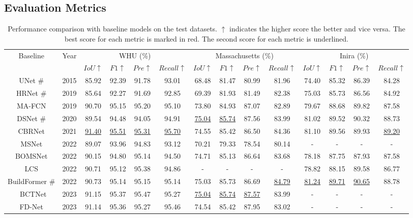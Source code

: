 \documentclass[lettersize,journal]{IEEEtran}
\begin{document}
\subsection{Evaluation Metrics}
\begin{table*}[]
\normalsize
\setlength\tabcolsep{3pt}
\caption{Performance comparison with baseline models on the test datasets. $\uparrow$ indicates the higher score the better and vice versa. The best score for each metric is marked in red. The second score for each metric is underlined.}
\label{tab:table_test}
\center
\begin{tabular}{c|c|cccc|cccc|cccc}
\hline
\multirow{2}{*}{Baseline}& \multirow{2}{*}{Year} & \multicolumn{4}{c|}{WHU (\%)}&\multicolumn{4}{c|}{Massachusetts (\%)} &\multicolumn{4}{c}{Inira (\%)}                                             
 \\ \cline{3-14} 
 & & $IoU\uparrow$ & $F1\uparrow$ & $Pre\uparrow$ & $Recall\uparrow$ 
 & $IoU\uparrow$ & $F1\uparrow$ & $Pre\uparrow$ & $Recall\uparrow$
 & $IoU\uparrow$ & $F1\uparrow$ & $Pre\uparrow$ & $Recall\uparrow$ \\ \hline
UNet \#& 2015 &
85.92 &92.39 &91.78 &93.01
&68.48	&81.47 &80.99	&81.96
&74.40	&85.32	&86.39	&84.28 \\
HRNet \#& 2019 &
85.64 &92.27 &91.69 &92.85
&69.39	&81.93	&81.49	&82.38
&75.03 &85.73 &86.56 &84.92\\ 
MA-FCN & 2019 &
90.70 &95.15 &95.20 &95.10
&73.80	&84.93	&87.07	&82.89
&79.67	&88.68	&89.82	&87.58 \\ 
DSNet \#& 2020 &
89.54 &94.48 &94.05 &94.91
&\underline{75.04}	&\underline{85.74}	&87.56	&83.99
&81.02	&89.52	&90.32	&88.73\\
CBRNet& 2021 &
\underline{91.40} &\underline{95.51} &\underline{95.31} &{\underline{95.70}}
&74.55	&85.42	&86.50	&84.36 
&81.10	&89.56	&89.93	&\underline{89.20}\\ 
MSNet & 2022 &
89.07 &93.96 &94.83 &93.12
&70.21	&79.33	&78.54	&80.14
& - &- &- &-\\ 
BOMSNet& 2022 &
90.15 &94.80 &95.14 &94.50
&74.71  &85.13	&86.64	&83.68
&78.18	&87.75	&87.93	&87.58\\ 
LCS & 2022 &
90.71 &95.12 &95.38 &94.86 
&- &- &- &-
&78.82	&88.15	&89.58	&86.77 \\
BuildFormer \#& 2022 &
90.73 &95.14 &{95.15} &95.14 
&75.03	&85.73	&86.69	&\underline{84.79}
&\underline{81.24}	&\underline{89.71}	&\underline{90.65}	&88.78
\\\
BCTNet & 2023 &
91.15 &95.37 &95.47 &95.27
&\underline{75.04} &\underline{85.74} &\underline{87.57} &83.99
&- & -&- &- \\
FD-Net &2023 &
91.14 & 95.36 & 95.27 &95.46
&74.54 &85.42 &87.95 &83.02
&- &- &- &- \\ \hline






\end{tabular}
\end{table*}
\end{document}
